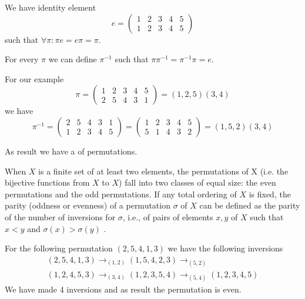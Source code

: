 \begin{appendices}
\begin{example}[Permutation]
  We have identity element
  \[
  e =  \begin{pmatrix}
    1 & 2 & 3 & 4 & 5 \\
    1 & 2 & 3 & 4 & 5
  \end{pmatrix}
  \]
  such that $\forall \pi: \pi e = e \pi = \pi$.
  
  For every $\pi$ we can define $\pi^{-1}$ such that
  $\pi \pi^{-1} = \pi^{-1} \pi = e$.

  For our example
  \[
  \pi = \begin{pmatrix}
    1 & 2 & 3 & 4 & 5 \\
    2 & 5 & 4 & 3 & 1
  \end{pmatrix} = (1,2,5)(3,4)
  \]
  we have
  \[
  \pi^{-1} = \begin{pmatrix}   
    2 & 5 & 4 & 3 & 1 \\
    1 & 2 & 3 & 4 & 5 
  \end{pmatrix} =
  \begin{pmatrix}   
    1 & 2 & 3 & 4 & 5 \\
    5 & 1 & 4 & 3 & 2 
  \end{pmatrix} = (1,5,2)(3,4)
  \]

  As result we have a  of permutations.
  \label{ex:permutation}
\end{example}

\begin{definition}
  When $X$ is a finite set of at least two elements, the permutations of
  X (i.e. the bijective functions from $X$ to $X$) fall into two classes
  of equal size: the even permutations and the odd permutations. If
  any total ordering of $X$ is fixed, the parity (oddness or evenness)
  of a permutation $\sigma$ of $X$ can be defined as the
  parity of the number of inversions for $\sigma$, i.e., of pairs of elements
  $x, y$ of $X$ such that $x < y$ and $\sigma (x) > \sigma (y)$
  \cite{wiki:paritypermutation}.  
  \label{def:paritypermutation}
\end{definition}

\begin{example}
  For the following permutation $(2,5,4,1,3)$ we have the following
  inversions
  \begin{eqnarray}
    (2,5,4,1,3) \to_{(1,2)}
    (1,5,4,2,3) \to_{(5,2)}
    \nonumber \\
    (1,2,4,5,3) \to_{(3,4)}
    (1,2,3,5,4) \to_{(5,4)}
    (1,2,3,4,5)
    \nonumber
  \end{eqnarray}
  We have made 4 inversions and as result the permutation is even.


\end{example}
\end{appendices}
